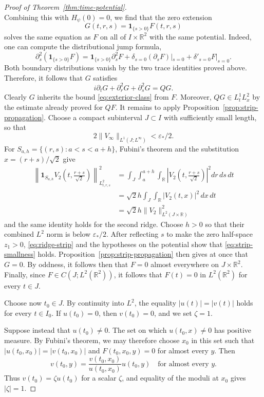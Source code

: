 \documentclass[11pt]{amsart}
\theoremstyle{remark}
\newcommand{\R}{\mathbb R}
\newcommand{\1}{\mathbf 1}
\begin{document}
\begin{proof}[Proof of Theorem~\ref{thm:time-potential}]
\[\]
Combining this with $H_{\psi}(0)=0$, we find that the zero extension
\[
 G(t,r,s)=\1_{\{s>0\}}F(t,r,s)
\]
solves the same equation as $F$ on all of $I\times\R^2$ with the same potential.  Indeed, one can compute the distributional jump formula,
\[
 \partial_s^2(\1_{\{s>0\}}F)
 =\1_{\{s>0\}}\partial_s^2F
  +\delta_{s=0}(\partial_sF)|_{s=0}+\delta'_{s=0}F|_{s=0}.
\]
Both boundary distributions vanish by the two trace identities proved above.  Therefore, it follows that $G$ satisfies
\[
 i\partial_tG+\partial_r^2G+\partial_s^2G=QG.
\]
Clearly $G$ inherits the bound \eqref{eq:exterior-class} from $F$. Moreover,
$QG\in L^1_tL_x^2$ by the estimate already proved for $QF$. It remains to apply Proposition~\ref{prop:strip-propagation}.  Choose a compact
subinterval $J\subset I$ with sufficiently small length, so that
\[
 2\|V_\infty\|_{L^1(J;L^\infty)}<\varepsilon_*/2.
\]
For $S_{a,h}=\{(r,s):a<s<a+h\}$, Fubini's theorem and the substitution
$x=(r+s)/\sqrt2$ give
\begin{equation}\label{eq:ridge-strip}
\begin{split}
 \left\|\1_{S_{a,h}}
 V_2\!\left(t,\frac{r+s}{\sqrt2}\right)\right\|_{L^2_{t,r,s}}^2&=\int_J\int_a^{a+h}\int_\R
 \left|V_2\!\left(t,\frac{r+s}{\sqrt2}\right)\right|^2dr\,ds\,dt\\
 &=\sqrt2h\int_J\int_\R|V_2(t,x)|^2\,dx\,dt
\\
&=\sqrt2h\|V_2\|_{L^2(J\times\R)}^2
\end{split}
\end{equation}
and the same identity holds for the second ridge.  Choose $h>0$ so that their
combined $L^2$ norm is below $\varepsilon_*/2$.  After reflecting $s$ to make
the zero half-space $z_1>0$, \eqref{eq:ridge-strip} and
the hypotheses on the potential show that \eqref{eq:strip-smallness} holds.
Proposition~\ref{prop:strip-propagation} then gives at once that $G=0$.  By oddness, it follows then that $F=0$ almost everywhere on $J\times\R^2$.  Finally, since 
$F\in C(J;L^2(\R^2))$, it follows that $F(t)=0$ in $L^2(\R^2)$ for every
$t\in J$.

Choose now $t_0\in J$. By continuity into $L^2$, the equality
$|u(t)|=|v(t)|$ holds for every $t\in I_0$. If $u(t_0)=0$, then
$v(t_0)=0$, and we set $\zeta=1$.

Suppose instead that $u(t_0)\ne0$. The set on which $u(t_0,x)\ne0$
has positive measure. By Fubini's theorem, we may therefore choose $x_0$
in this set such that $|u(t_0,x_0)|=|v(t_0,x_0)|$ and
$F(t_0,x_0,y)=0$ for almost every $y$. Then
\[
 v(t_0,y)=\frac{v(t_0,x_0)}{u(t_0,x_0)}u(t_0,y)
 \quad\text{for almost every }y.
\]
Thus $v(t_0)=\zeta u(t_0)$ for a scalar $\zeta$, and equality of the
moduli at $x_0$ gives $|\zeta|=1$.


\end{proof}
\end{document}
